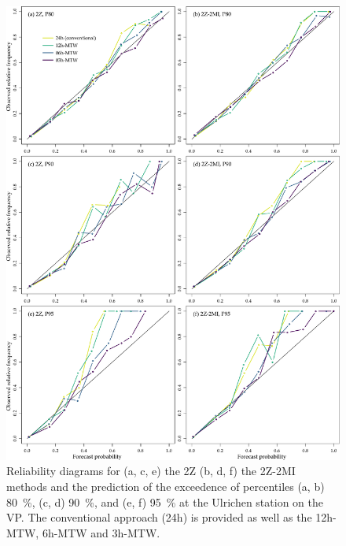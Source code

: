 \documentclass[hess, manuscript]{copernicus}
\begin{document}
	\begin{figure}[htb]
		\begin{center}
			\includegraphics[width=14cm]{fig12.pdf}
		\end{center}
		\caption{Reliability diagrams for (a, c, e) the 2Z (b, d, f) the 2Z-2MI methods and the prediction of the exceedence of percentiles (a, b) 80~\%, (c, d) 90~\%, and (e, f) 95~\% at the Ulrichen station on the VP. The conventional approach (24h) is provided as well as the 12h-MTW, 6h-MTW and 3h-MTW.}
		\label{fig:reliability_diagrams}
	\end{figure}
\end{document}
